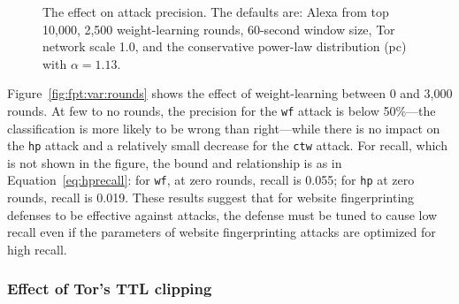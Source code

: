 \begin{figure}[t]
\centering
{}
\caption{The effect on attack precision. The defaults are: Alexa from top 10,000,
2,500 weight-learning rounds,
60-second window size, Tor network scale 1.0, and the conservative
power-law distribution (pc) with $\alpha=1.13$.}
\label{fig:fpt:var}
\end{figure}


Figure~\ref{fig:fpt:var:rounds} shows the effect of weight-learning between 0
and 3,000 rounds.  At few to no rounds, the precision for the
\texttt{wf} attack is below 50\%---the classification is more likely to be wrong
than right---while there is no impact on the \texttt{hp} attack and a relatively
small decrease for the \texttt{ctw} attack.
For recall, which is not shown in the figure, the bound and relationship is
as in Equation~\ref{eq:hprecall}: for \texttt{wf}, at zero rounds, recall is
0.055; for \texttt{hp} at zero rounds, recall is 0.019. These results suggest
that for website fingerprinting defenses to be effective against \name attacks,
the defense must be tuned to cause low recall even if the parameters of
website fingerprinting attacks are optimized for high recall.

\subsubsection{Effect of Tor's TTL clipping}

